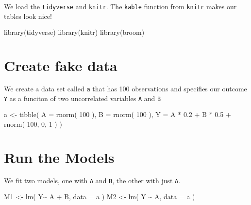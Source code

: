 \documentclass[
  letterpaper,
  DIV=11,
  numbers=noendperiod]{scrreprt}
\newenvironment{Shaded}{\begin{snugshade}}{\end{snugshade}}
\newcommand{\AttributeTok}[1]{\textcolor[rgb]{0.49,0.56,0.16}{#1}}
\newcommand{\DecValTok}[1]{\textcolor[rgb]{0.25,0.63,0.44}{#1}}
\newcommand{\FloatTok}[1]{\textcolor[rgb]{0.25,0.63,0.44}{#1}}
\newcommand{\FunctionTok}[1]{\textcolor[rgb]{0.02,0.16,0.49}{#1}}
\newcommand{\NormalTok}[1]{\textcolor[rgb]{0.00,0.44,0.13}{#1}}
\newcommand{\OtherTok}[1]{\textcolor[rgb]{0.00,0.44,0.13}{#1}}
\newcommand{\SpecialCharTok}[1]{\textcolor[rgb]{0.25,0.44,0.63}{#1}}
\begin{document}
We load the \texttt{tidyverse} and \texttt{knitr}. The \texttt{kable}
function from \texttt{knitr} makes our tables look nice!

\begin{Shaded}
\begin{Highlighting}[]
\FunctionTok{library}\NormalTok{(tidyverse)}
\FunctionTok{library}\NormalTok{(knitr)}
\FunctionTok{library}\NormalTok{(broom)}
\end{Highlighting}
\end{Shaded}

\hypertarget{create-fake-data}{%
\section{Create fake data}\label{create-fake-data}}

We create a data set called \texttt{a} that has 100 observations and
specifies our outcome \texttt{Y} as a funciton of two uncorrelated
variables \texttt{A} and \texttt{B}

\begin{Shaded}
\begin{Highlighting}[]
\NormalTok{a }\OtherTok{\textless{}{-}} \FunctionTok{tibble}\NormalTok{( }\AttributeTok{A =} \FunctionTok{rnorm}\NormalTok{( }\DecValTok{100}\NormalTok{ ),}
            \AttributeTok{B =} \FunctionTok{rnorm}\NormalTok{( }\DecValTok{100}\NormalTok{ ),}
            \AttributeTok{Y =}\NormalTok{ A }\SpecialCharTok{*} \FloatTok{0.2} \SpecialCharTok{+}\NormalTok{ B }\SpecialCharTok{*} \FloatTok{0.5} \SpecialCharTok{+} \FunctionTok{rnorm}\NormalTok{( }\DecValTok{100}\NormalTok{, }\DecValTok{0}\NormalTok{, }\DecValTok{1}\NormalTok{ ) )}
\end{Highlighting}
\end{Shaded}

\hypertarget{run-the-models}{%
\section{Run the Models}\label{run-the-models}}

We fit two models, one with \texttt{A} and \texttt{B}, the other with
just \texttt{A}.

\begin{Shaded}
\begin{Highlighting}[]
\NormalTok{M1 }\OtherTok{\textless{}{-}} \FunctionTok{lm}\NormalTok{( Y}\SpecialCharTok{\textasciitilde{}}\NormalTok{ A }\SpecialCharTok{+}\NormalTok{ B, }\AttributeTok{data =}\NormalTok{ a )}
\NormalTok{M2 }\OtherTok{\textless{}{-}} \FunctionTok{lm}\NormalTok{( Y }\SpecialCharTok{\textasciitilde{}}\NormalTok{ A, }\AttributeTok{data =}\NormalTok{ a )}
\end{Highlighting}
\end{Shaded}
\end{document}
